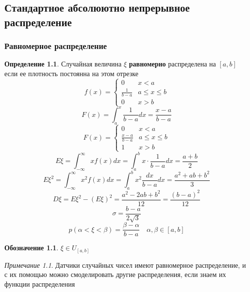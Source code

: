 \documentclass[oneside]{book}
\theoremstyle{plain}
\theoremstyle{remark}
\newtheorem*{remark}{Примечание}
\theoremstyle{definition}
\newtheorem*{definition}{Определение}
\newtheorem*{symb}{Обозначение}
\begin{document}
\chapter{}
\label{sec:orgab6e771}
\section{Стандартное абсолюютно непрерывное распределение}
\label{sec:orgc593694}
\subsection{Равномерное распределение}
\label{sec:org8976a57}
\begin{definition}
Случайная величина \(\xi\) \textbf{равномерно} распределена на \([a, b]\) если ее плотность постоянна на этом отрезке
\[ f(x) = \begin{cases}
0 & x < a \\
\frac{1}{b - a} & a \le x \le b \\
0 & x > b
\end{cases}\]
\[ F(x) = \int_a^x \frac{1}{b - a}dx = \frac{x - a}{b - a} \]
\[ F(x) = \begin{cases}
0 & x < a \\
\frac{x - a}{b - a} & a \le x \le b \\
1 & x > b
\end{cases} \]
\[ E\xi = \int_{-\infty}^\infty x f(x) dx = \int_a^b x \cdot \frac{1}{b - a} dx = \frac{a + b}{2} \]
\[ E\xi^2 = \int_{-\infty}^\infty x^2f(x) dx = \int_a^b x^2 \frac{dx}{b - a}dx = \frac{a^2 + ab + b^2}{3} \]
\[ D\xi = E\xi^2 - (E\xi)^2 = \frac{a^2 - 2ab + b^2}{12} = \frac{(b - a)^2}{12} \]
\[ \sigma = \frac{b - a}{2\sqrt{3}} \]
\[ p(\alpha < \xi < \beta) = \frac{\beta - \alpha}{b - a} \quad \alpha, \beta \in [a, b] \]
\end{definition}
\begin{symb}
\(\xi \in U_{[a, b]}\)
\end{symb}
\begin{remark}
Датчики случайных чисел имеют равномерное распределение, и с их помощью можно смоделировать другие распределения, если знаем их функции распределения
\end{remark}
\end{document}
